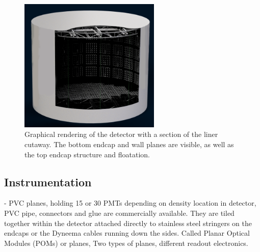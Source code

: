 \begin{figure} %
    \includegraphics[width=0.6\textwidth]{diagrams/4-chips/chips_render_1.png}
    \caption[Graphical rendering of the \chipsfive detector.]
    {Graphical rendering of the \chipsfive detector with a section of the liner cutaway. The
        bottom endcap and wall planes are visible, as well as the top endcap structure and
        floatation.}
    \label{fig:chips_render}
\end{figure}

\subsection{Instrumentation} %
\label{sec:chips_detector_instrumentation} %

- PVC planes, holding 15 or 30 PMTs depending on density location in detector, PVC pipe,
connectors and glue are commercially available. They are tiled together within the detector
attached directly to stainless steel stringers on the endcaps or the Dyneema cables running down
the sides. Called Planar Optical Modules (POMs) or planes, Two types of planes, different readout
electronics.


